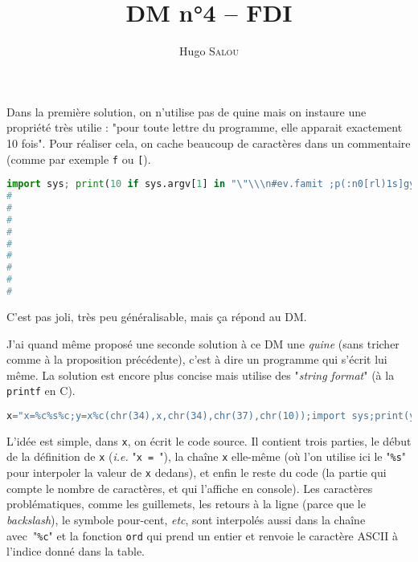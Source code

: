 \documentclass{../../notes}
\title{DM n°4 -- FDI}
\author{Hugo \scshape Salou}
\begin{document}
  \maketitle

  Dans la première solution, on n'utilise pas de quine mais on instaure une propriété très utilie : "pour toute lettre du programme, elle apparait exactement 10 fois". Pour réaliser cela, on cache beaucoup de caractères dans un commentaire (comme par exemple \texttt{f} ou \texttt{[}).

  \begin{lstlisting}[language=Python,caption=Solution sans quine au DM 4,breaklines=true,postbreak=\mbox{\textcolor{deepblue}{$\hookrightarrow$}\space}]
import sys; print(10 if sys.argv[1] in "\"\\\n#ev.famit ;p(:n0[rl)1s]gyo" else 0) #eeeeeeevvvvvvvv........ffffffffaaaaaaaammmmmmmmiiiiitttttttppppppp\\\\\\((((((((:::::::::"""""""nnnnnn0000000[[[[[[[[rrrrrr;;;;;;;;llllllll))))))))1111111ssss]]]]]]]]ggggggggyyyyyyyoooooooo
#
#
#
#
#
#
#
#
#
  \end{lstlisting}
  C'est pas joli, très peu généralisable, mais ça répond au DM.

  J'ai quand même proposé une seconde solution à ce DM une \textit{quine} (sans tricher comme à la proposition précédente), c'est à dire un programme qui s'écrit lui même.
  La solution est encore plus concise mais utilise des "\textit{string format}" (à la \texttt{printf} en C).

  \begin{lstlisting}[language=Python,caption=Solution avec quine au DM 4, breaklines=true, postbreak=\mbox{\textcolor{deepblue}{$\hookrightarrow$}\space}]
x="x=%c%s%c;y=x%c(chr(34),x,chr(34),chr(37),chr(10));import sys;print(y.count(sys.argv[1]))%c";y=x%(chr(34),x,chr(34),chr(37),chr(10));import sys;print(y.count(sys.argv[1]))
  \end{lstlisting}

  L'idée est simple, dans \texttt{x}, on écrit le code source.
  Il contient trois parties, le début de la définition de \texttt{x} (\textit{i.e.} "\texttt{x = }"), la chaîne \texttt{x} elle-même (où l'on utilise ici le "\texttt{\%s}" pour interpoler la valeur de \texttt{x} dedans), et enfin le reste du code (la partie qui compte le nombre de caractères, et qui l'affiche en console).
  Les caractères problématiques, comme les guillemets, les retours à la ligne (parce que le \textit{backslash}), le symbole pour-cent, \textit{etc}, sont interpolés aussi dans la chaîne avec~"\texttt{\%c}" et la fonction \texttt{ord} qui prend un entier et renvoie le caractère ASCII à l'indice donné dans la table.
\end{document}
